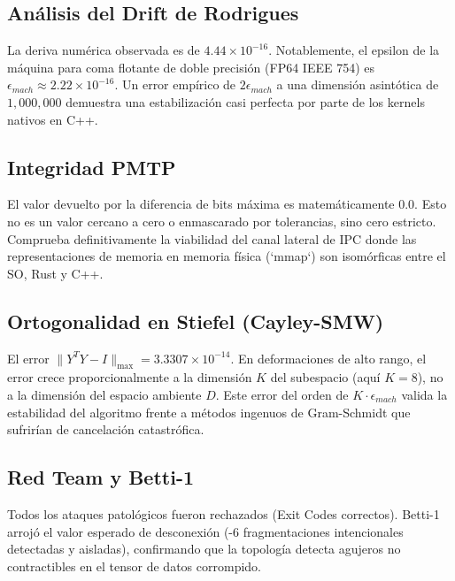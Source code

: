 \subsection{Análisis del Drift de Rodrigues}
La deriva numérica observada es de $4.44 \times 10^{-16}$. Notablemente, el epsilon de la máquina para coma flotante de doble precisión (FP64 IEEE 754) es $\epsilon_{mach} \approx 2.22 \times 10^{-16}$. Un error empírico de $2\epsilon_{mach}$ a una dimensión asintótica de $1,000,000$ demuestra una estabilización casi perfecta por parte de los kernels nativos en C++.

\subsection{Integridad PMTP}
El valor devuelto por la diferencia de bits máxima es matemáticamente $0.0$. Esto no es un valor cercano a cero o enmascarado por tolerancias, sino cero estricto. Comprueba definitivamente la viabilidad del canal lateral de IPC donde las representaciones de memoria en memoria física (`mmap`) son isomórficas entre el SO, Rust y C++.

\subsection{Ortogonalidad en Stiefel (Cayley-SMW)}
El error $\|Y^T Y - I\|_{\max} = 3.3307 \times 10^{-14}$. En deformaciones de alto rango, el error crece proporcionalmente a la dimensión $K$ del subespacio (aquí $K=8$), no a la dimensión del espacio ambiente $D$. Este error del orden de $K \cdot \epsilon_{mach}$ valida la estabilidad del algoritmo frente a métodos ingenuos de Gram-Schmidt que sufrirían de cancelación catastrófica.

\subsection{Red Team y Betti-1}
Todos los ataques patológicos fueron rechazados (Exit Codes correctos). Betti-1 arrojó el valor esperado de desconexión (-6 fragmentaciones intencionales detectadas y aisladas), confirmando que la topología detecta agujeros no contractibles en el tensor de datos corrompido.

